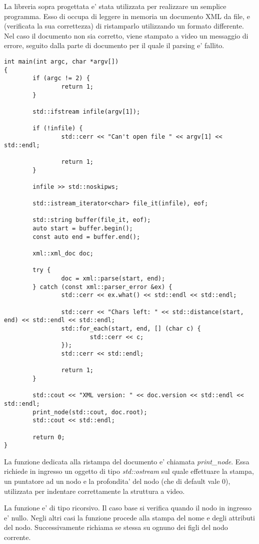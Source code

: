 \documentclass[italian,a4paper]{article}
\begin{document}
La libreria sopra progettata e' stata utilizzata per realizzare un semplice
programma. Esso di occupa di leggere in memoria un documento XML da file, e
(verificata la sua correttezza) di ristamparlo utilizzando un formato
differente. Nel caso il documento non sia corretto, viene stampato a video un
messaggio di errore, seguito dalla parte di documento per il quale il parsing e'
fallito.

\begin{verbatim}
int main(int argc, char *argv[])
{
        if (argc != 2) {
                return 1;
        }   

        std::ifstream infile(argv[1]);

        if (!infile) {
                std::cerr << "Can't open file " << argv[1] << std::endl;

                return 1;
        }   

        infile >> std::noskipws;

        std::istream_iterator<char> file_it(infile), eof;

        std::string buffer(file_it, eof);
        auto start = buffer.begin();
        const auto end = buffer.end();

        xml::xml_doc doc;

        try {
                doc = xml::parse(start, end);
        } catch (const xml::parser_error &ex) {
                std::cerr << ex.what() << std::endl << std::endl;

                std::cerr << "Chars left: " << std::distance(start, end) << std::endl << std::endl;
                std::for_each(start, end, [] (char c) {
                        std::cerr << c;
                }); 
                std::cerr << std::endl;

                return 1;
        }   

        std::cout << "XML version: " << doc.version << std::endl << std::endl;
        print_node(std::cout, doc.root);
        std::cout << std::endl;

        return 0;
}
\end{verbatim}

La funzione dedicata alla ristampa del documento e' chiamata \emph{print_node}.
Essa richiede in ingresso un oggetto di tipo \emph{std::ostream} sul quale
effettuare la stampa, un puntatore ad un nodo e la profondita' del nodo (che di
default vale 0), utilizzata per indentare correttamente la struttura a video.

La funzione e' di tipo ricorsivo. Il caso base si verifica quando il nodo in
ingresso e' nullo. Negli altri casi la funzione procede alla stampa del nome e
degli attributi del nodo. Successivamente richiama se stessa su ognuno dei figli
del nodo corrente.
\end{document}

